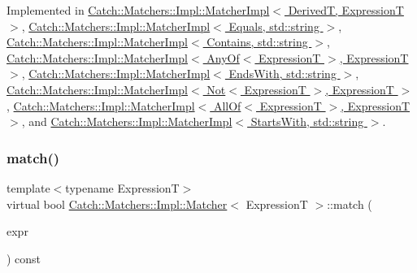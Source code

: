 Implemented in \hyperlink{struct_catch_1_1_matchers_1_1_impl_1_1_matcher_impl_af7cf4b7b730145d4455dc356490e6b77}{Catch\+::\+Matchers\+::\+Impl\+::\+Matcher\+Impl$<$ Derived\+T, Expression\+T $>$}, \hyperlink{struct_catch_1_1_matchers_1_1_impl_1_1_matcher_impl_af7cf4b7b730145d4455dc356490e6b77}{Catch\+::\+Matchers\+::\+Impl\+::\+Matcher\+Impl$<$ Equals, std\+::string $>$}, \hyperlink{struct_catch_1_1_matchers_1_1_impl_1_1_matcher_impl_af7cf4b7b730145d4455dc356490e6b77}{Catch\+::\+Matchers\+::\+Impl\+::\+Matcher\+Impl$<$ Contains, std\+::string $>$}, \hyperlink{struct_catch_1_1_matchers_1_1_impl_1_1_matcher_impl_af7cf4b7b730145d4455dc356490e6b77}{Catch\+::\+Matchers\+::\+Impl\+::\+Matcher\+Impl$<$ Any\+Of$<$ Expression\+T $>$, Expression\+T $>$}, \hyperlink{struct_catch_1_1_matchers_1_1_impl_1_1_matcher_impl_af7cf4b7b730145d4455dc356490e6b77}{Catch\+::\+Matchers\+::\+Impl\+::\+Matcher\+Impl$<$ Ends\+With, std\+::string $>$}, \hyperlink{struct_catch_1_1_matchers_1_1_impl_1_1_matcher_impl_af7cf4b7b730145d4455dc356490e6b77}{Catch\+::\+Matchers\+::\+Impl\+::\+Matcher\+Impl$<$ Not$<$ Expression\+T $>$, Expression\+T $>$}, \hyperlink{struct_catch_1_1_matchers_1_1_impl_1_1_matcher_impl_af7cf4b7b730145d4455dc356490e6b77}{Catch\+::\+Matchers\+::\+Impl\+::\+Matcher\+Impl$<$ All\+Of$<$ Expression\+T $>$, Expression\+T $>$}, and \hyperlink{struct_catch_1_1_matchers_1_1_impl_1_1_matcher_impl_af7cf4b7b730145d4455dc356490e6b77}{Catch\+::\+Matchers\+::\+Impl\+::\+Matcher\+Impl$<$ Starts\+With, std\+::string $>$}.

\hypertarget{struct_catch_1_1_matchers_1_1_impl_1_1_matcher_a8c1c5511ce1f3738a45e6901b558f583}{}\label{struct_catch_1_1_matchers_1_1_impl_1_1_matcher_a8c1c5511ce1f3738a45e6901b558f583} 
\subsubsection{\texorpdfstring{match()}{match()}}
{\footnotesize\ttfamily template$<$typename ExpressionT$>$ \\
virtual bool \hyperlink{struct_catch_1_1_matchers_1_1_impl_1_1_matcher}{Catch\+::\+Matchers\+::\+Impl\+::\+Matcher}$<$ ExpressionT $>$\+::match (\begin{DoxyParamCaption}\item[{ExpressionT const \&}]{expr }\end{DoxyParamCaption}) const\hspace{0.3cm}{\ttfamily [pure virtual]}}




